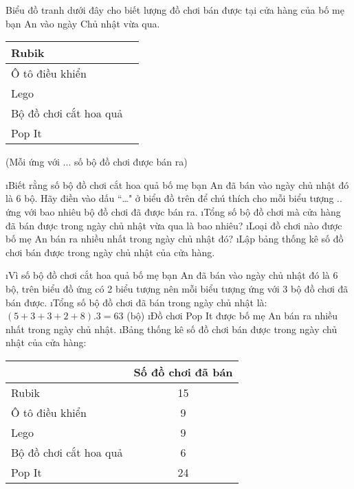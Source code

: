 \begin{bt}
	Biểu đồ tranh dưới đây cho biết lượng đồ chơi bán được tại cửa hàng của bố mẹ bạn An vào ngày Chủ nhật vừa qua. 
	\begin{center}
		\begin{tabular}{|l|l|}
			\hline
			Rubik&	 \\
			 \hline
			Ô tô điều khiển	& \\
			\hline
			Lego&	\\
			\hline
			Bộ đồ chơi cắt hoa quả&	\\
			\hline
			Pop It&	\\
			\hline
		\end{tabular}
	
	\vspace*{5pt}
	(Mỗi  ứng với ... số bộ đồ chơi được bán ra)
	\end{center}
	\begin{enumerate}[a),leftmargin=*]
		\i Biết rằng số bộ đồ chơi cắt hoa quả bố mẹ bạn An đã bán vào ngày chủ nhật đó là 6 bộ. Hãy điền vào dấu  ``\ldots" ở biểu đồ trên để chú thích cho mỗi biểu tượng .. ứng với bao nhiêu bộ đồ chơi đã được bán ra.
		\i Tổng số bộ đồ chơi mà cửa hàng đã bán được trong ngày chủ nhật vừa qua là bao nhiêu?
		\i Loại đồ chơi nào được bố mẹ An bán ra nhiều nhất trong ngày chủ nhật đó?
		\i Lập bảng thống kê số đồ chơi bán được trong ngày chủ nhật của cửa hàng.
	\end{enumerate}
	\begin{loigiaichuong40}
		\begin{enumerate}[a),leftmargin=*]
			\i Vì số bộ đồ chơi cắt hoa quả bố mẹ bạn An đã bán vào ngày chủ nhật đó là 6 bộ, trên biểu đồ ứng có 2 biểu tượng nên mỗi biểu tượng  ứng với 3 bộ đồ chơi đã bán được.
			\i Tổng số bộ đồ chơi đã bán trong ngày chủ nhật là: $\left( {5 + 3 + 3 + 2 + 8} \right).3 = 63$  (bộ)
			\i Đồ chơi Pop It được bố mẹ An bán ra nhiều nhất trong ngày chủ nhật.
			\i Bảng thống kê số đồ chơi bán được trong ngày chủ nhật của cửa hàng:
			\begin{center}
				\begin{tabular}{|l|c|}
					\hline
					&Số đồ chơi đã bán\\
					\hline
					Rubik&	15\\
					\hline
					Ô tô điều khiển&	9\\
					\hline
					Lego&	9\\
					\hline
					Bộ đồ chơi cắt hoa quả&	6\\
					\hline
					Pop It&	24\\
					\hline
				\end{tabular}
			\end{center}
		\end{enumerate}
	\end{loigiaichuong40}
\end{bt}
